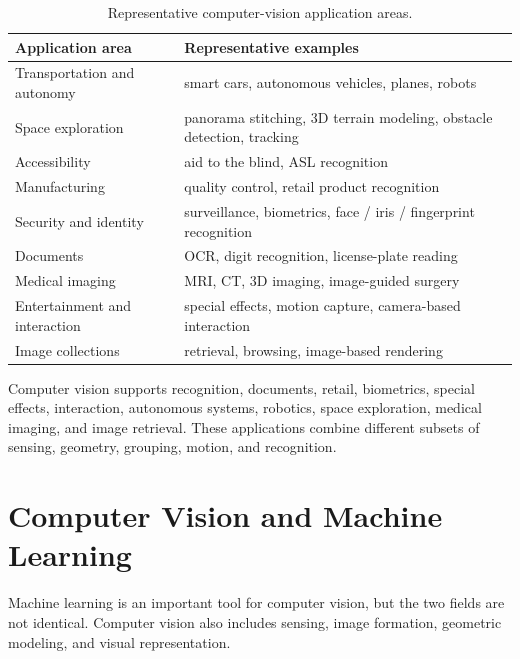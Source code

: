\documentclass[11pt,a4paper,oneside]{report}
\renewcommand{\arraystretch}{1.25}
\begin{document}
\begin{table}[!htbp]
\centering
\caption{Representative computer-vision application areas.}
\label{tab:applications}
\small
\renewcommand{\arraystretch}{1.08}
\begin{tabularx}{\textwidth}{Y Y}
\toprule
{}
\textbf{Application area} & \textbf{Representative examples} \\
\midrule
Transportation and autonomy & smart cars, autonomous vehicles, planes, robots \\
Space exploration & panorama stitching, 3D terrain modeling, obstacle detection, tracking \\
Accessibility & aid to the blind, ASL recognition \\
Manufacturing & quality control, retail product recognition \\
Security and identity & surveillance, biometrics, face / iris / fingerprint recognition \\
Documents & OCR, digit recognition, license-plate reading \\
Medical imaging & MRI, CT, 3D imaging, image-guided surgery \\
Entertainment and interaction & special effects, motion capture, camera-based interaction \\
Image collections & retrieval, browsing, image-based rendering \\
\bottomrule
\end{tabularx}
\end{table}

\FloatBarrier
\begin{chaptersummary}
Computer vision supports recognition, documents, retail, biometrics, special effects, interaction, autonomous systems, robotics, space exploration, medical imaging, and image retrieval. These applications combine different subsets of sensing, geometry, grouping, motion, and recognition.
\end{chaptersummary}

\chapter{Computer Vision and Machine Learning}

Machine learning is an important tool for computer vision, but the two fields are not identical. Computer vision also includes sensing, image formation, geometric modeling, and visual representation.
\end{document}
